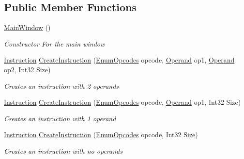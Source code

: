 \subsection*{Public Member Functions}
\begin{DoxyCompactItemize}
\item 
\hyperlink{class_c_p_u___o_s___simulator_1_1_main_window_a33462505a86657583c1560cbf02172bd}{Main\+Window} ()
\begin{DoxyCompactList}\small\item\em Constructor For the main window \end{DoxyCompactList}\item 
\hyperlink{class_c_p_u___o_s___simulator_1_1_c_p_u_1_1_instruction}{Instruction} \hyperlink{class_c_p_u___o_s___simulator_1_1_main_window_a0786a3f7a368c6e63f6e49bc70d3083d}{Create\+Instruction} (\hyperlink{namespace_c_p_u___o_s___simulator_1_1_c_p_u_ac29c87bff87ad404c953b2581024043e}{Enum\+Opcodes} opcode, \hyperlink{class_c_p_u___o_s___simulator_1_1_c_p_u_1_1_operand}{Operand} op1, \hyperlink{class_c_p_u___o_s___simulator_1_1_c_p_u_1_1_operand}{Operand} op2, Int32 Size)
\begin{DoxyCompactList}\small\item\em Creates an instruction with 2 operands \end{DoxyCompactList}\item 
\hyperlink{class_c_p_u___o_s___simulator_1_1_c_p_u_1_1_instruction}{Instruction} \hyperlink{class_c_p_u___o_s___simulator_1_1_main_window_a91d73f33961d6268e741d7f2cf6a2b6d}{Create\+Instruction} (\hyperlink{namespace_c_p_u___o_s___simulator_1_1_c_p_u_ac29c87bff87ad404c953b2581024043e}{Enum\+Opcodes} opcode, \hyperlink{class_c_p_u___o_s___simulator_1_1_c_p_u_1_1_operand}{Operand} op1, Int32 Size)
\begin{DoxyCompactList}\small\item\em Creates an instruction with 1 operand \end{DoxyCompactList}\item 
\hyperlink{class_c_p_u___o_s___simulator_1_1_c_p_u_1_1_instruction}{Instruction} \hyperlink{class_c_p_u___o_s___simulator_1_1_main_window_a0616de56bcd9f57feb247f7e5de55f5f}{Create\+Instruction} (\hyperlink{namespace_c_p_u___o_s___simulator_1_1_c_p_u_ac29c87bff87ad404c953b2581024043e}{Enum\+Opcodes} opcode, Int32 Size)
\begin{DoxyCompactList}\small\item\em Creates an instruction with no operands \end{DoxyCompactList}\item 

\end{DoxyCompactItemize}
